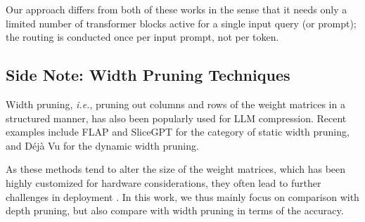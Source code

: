 Our approach differs from both of these works in the sense that it needs only a limited number of transformer blocks active for a single input query (or prompt); the routing is conducted once per input prompt, not per token.

\subsection{Side Note: Width Pruning Techniques}

Width pruning, \textit{i.e.}, pruning out columns and rows of the weight matrices in a structured manner, has also been popularly used for LLM compression. Recent examples include FLAP \citep{an2024flap} and SliceGPT \citep{ashkboosslicegpt} for the category of static width pruning, and D\'{e}j\`{a} Vu \cite{liu2023deja} for the dynamic width pruning.

As these methods tend to alter the size of the weight matrices, which has been highly customized for hardware considerations, they often lead to further challenges in deployment \citep{songsleb,kim2024shortened}. In this work, we thus mainly focus on comparison with depth pruning, but also compare with width pruning in terms of the accuracy.




